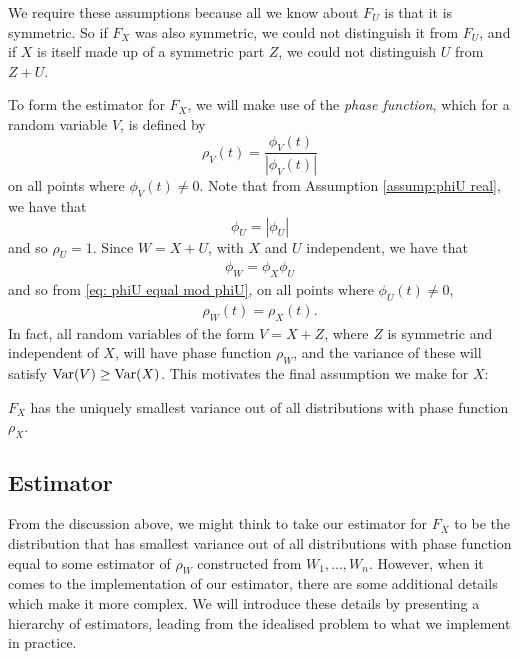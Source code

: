 	We require these assumptions because all we know about $F_U$ is that it is symmetric. So if $F_X$ was also symmetric, we could not distinguish it from $F_U$, and if $X$ is itself made up of a symmetric part $Z$, we could not distinguish $U$ from $Z+U$.


	To form the estimator for $F_X$, we will make use of the \emph{phase function}, which for a random variable $V$, is defined by
	\begin{equation}
		\rho_V(t) = \frac{\phi_V(t)}{|\phi_V(t)|}
	\end{equation}
	on all points where $\phi_V(t) \neq 0$.
	Note that from Assumption \ref{assump:phiU real}, we have that 
	\begin{equation}
	\label{eq: phiU equal mod phiU}
		\phi_U = |\phi_U|
	\end{equation}
	and so $\rho_U = 1$.
	Since $W = X+U$, with $X$ and $U$ independent, we have that
	\begin{align}
		\phi_W = \phi_X \phi_U
	\end{align}
	and so from \eqref{eq: phiU equal mod phiU}, on all points where $\phi_U(t) \neq 0$,
	\begin{align}
		\rho_W(t) = \rho_X(t).
	\end{align}
	In fact, all random variables of the form $V = X + Z$, where $Z$ is symmetric and independent of $X$, will have phase function $\rho_W$, and the variance of these will satisfy $\mathrm{Var}(V) \geq \mathrm{Var}(X)$. This motivates the final assumption we make for $X$:

	\begin{assumption}
	\label{assump:X has smallest variance}
		$F_X$ has the uniquely smallest variance out of all distributions with phase function $\rho_X$.
	\end{assumption}

	\subsection{Estimator}
	\label{sec:deconvolution estimator}
	From the discussion above, we might think to take our estimator for $F_X$ to be the distribution that has smallest variance out of all distributions with phase function equal to some estimator of $\rho_W$ constructed from $W_1, \dots, W_n$. However, when it comes to the implementation of our estimator, there are some additional details which make it more complex. We will introduce these details by presenting a hierarchy of estimators, leading from the idealised problem to what we implement in practice. 


